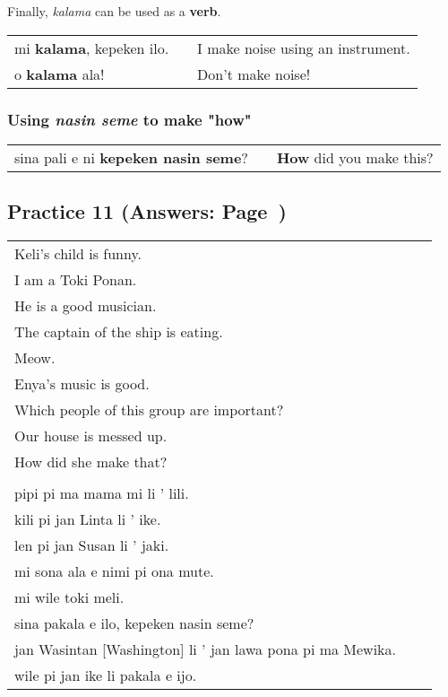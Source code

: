 Finally, \textit{kalama} can be used as a \textbf{verb}. \\
\begin{supertabular}{p{5,5cm}|ll}
mi \textbf{kalama}, kepeken ilo. && I make noise using an instrument. \\
o \textbf{kalama} ala! && Don't make noise! \\
\end{supertabular}  
%
\subsubsection*{Using \textit{nasin seme} to make "how"}
%
\begin{supertabular}{p{5,5cm}|ll}
sina pali e ni \textbf{kepeken nasin seme}? && \textbf{How} did you make this? \\
\end{supertabular}  
%
%
\subsection*{Practice 11 (Answers: Page~\pageref{'pi'})}
%
\begin{supertabular}{p{5,5cm}|ll}
Keli's child is funny.    \\ %
I am a Toki Ponan.   \\  %
He is a good musician.   \\  %
The captain of the ship is eating.    \\ %
Meow.    \\ %
Enya's music is good.    \\ %
Which people of this group are important?    \\ %
Our house is messed up.    \\ %
How did she make that?    \\ %
 && \\ %
pipi pi ma mama mi li ' lili.  \\ %
kili pi jan Linta li ' ike.    \\ %
len pi jan Susan li ' jaki.    \\ %
mi sona ala e nimi pi ona mute.    \\ %
mi wile toki meli.    \\ %
sina pakala e ilo, kepeken nasin seme?    \\ %
jan Wasintan [Washington] li ' jan lawa pona pi ma Mewika.  \\   %
wile pi jan ike li pakala e ijo.    \\ %
\end{supertabular}  

